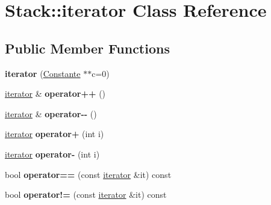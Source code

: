\hypertarget{class_stack_1_1iterator}{\section{Stack\-:\-:iterator Class Reference}
\label{class_stack_1_1iterator}
}
\subsection*{Public Member Functions}
\begin{DoxyCompactItemize}
\item 
\hypertarget{class_stack_1_1iterator_a4b9792711672ac97ec495af782860279}{{\bfseries iterator} (\hyperlink{class_calcul_1_1_constante}{Constante} $\ast$$\ast$c=0)}\label{class_stack_1_1iterator_a4b9792711672ac97ec495af782860279}

\item 
\hypertarget{class_stack_1_1iterator_a0a077f983ba21687eeda7b3788816cf1}{\hyperlink{class_stack_1_1iterator}{iterator} \& {\bfseries operator++} ()}\label{class_stack_1_1iterator_a0a077f983ba21687eeda7b3788816cf1}

\item 
\hypertarget{class_stack_1_1iterator_a2c52416481ccb91a5681d01d372abf9e}{\hyperlink{class_stack_1_1iterator}{iterator} \& {\bfseries operator-\/-\/} ()}\label{class_stack_1_1iterator_a2c52416481ccb91a5681d01d372abf9e}

\item 
\hypertarget{class_stack_1_1iterator_a16234d3b7b4fd5b49cd634e062a9240c}{\hyperlink{class_stack_1_1iterator}{iterator} {\bfseries operator+} (int i)}\label{class_stack_1_1iterator_a16234d3b7b4fd5b49cd634e062a9240c}

\item 
\hypertarget{class_stack_1_1iterator_ac329d5beacfe94923df7c0c092a3cfdc}{\hyperlink{class_stack_1_1iterator}{iterator} {\bfseries operator-\/} (int i)}\label{class_stack_1_1iterator_ac329d5beacfe94923df7c0c092a3cfdc}

\item 
\hypertarget{class_stack_1_1iterator_a820678f63d31ed6a39fcdff8bf75b92f}{bool {\bfseries operator==} (const \hyperlink{class_stack_1_1iterator}{iterator} \&it) const }\label{class_stack_1_1iterator_a820678f63d31ed6a39fcdff8bf75b92f}

\item 
\hypertarget{class_stack_1_1iterator_a51e29caedfcff04927f50629275d6b79}{bool {\bfseries operator!=} (const \hyperlink{class_stack_1_1iterator}{iterator} \&it) const }\label{class_stack_1_1iterator_a51e29caedfcff04927f50629275d6b79}


\end{DoxyCompactItemize}
